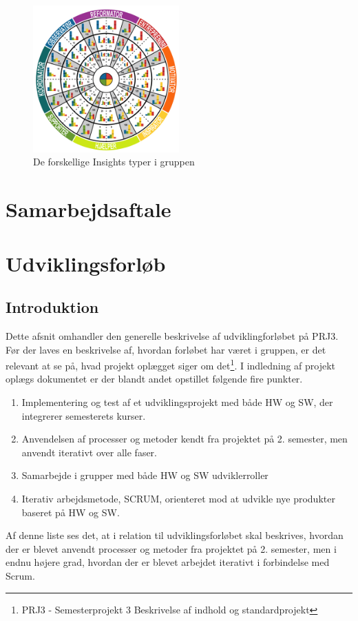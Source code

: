 \documentclass[a4paper,12pt,fleqn,oneside]{article}
\begin{document}
\begin{figure}[H]
    \centering
    \includegraphics[width=0.5\textwidth]{Processdokument/graphics/type_cirkel.png}
    \caption{De forskellige Insights typer i gruppen}
    \label{fig:group_types}
\end{figure}

\section{Samarbejdsaftale}


\section{Udviklingsforløb}
\subsection{Introduktion}
Dette afsnit omhandler den generelle beskrivelse af udviklingforløbet på PRJ3. Før der laves en beskrivelse af, hvordan forløbet har været i gruppen, er det relevant at se på, hvad projekt oplægget siger om det\footnote{PRJ3 - Semesterprojekt 3
Beskrivelse af indhold og standardprojekt}. I indledning af projekt oplægs dokumentet er der blandt andet opstillet følgende fire punkter.
\begin{enumerate}
    \item Implementering og test af et udviklingsprojekt med både HW og SW, der integrerer semesterets kurser.
    \item Anvendelsen af processer og metoder kendt fra projektet på 2. semester, men anvendt iterativt over alle faser.
    \item Samarbejde i grupper med både HW og SW udviklerroller
    \item Iterativ arbejdsmetode, SCRUM, orienteret mod at udvikle nye produkter baseret på HW og SW.
\end{enumerate}
Af denne liste ses det, at i relation til udviklingsforløbet skal beskrives, hvordan der er blevet anvendt processer og metoder fra projektet på 2. semester, men i endnu højere grad, hvordan der er blevet arbejdet iterativt i forbindelse med Scrum.
\end{document}
